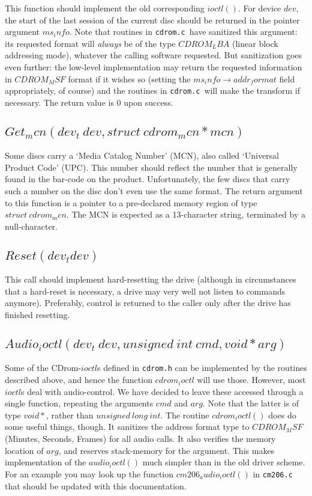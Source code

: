 \documentclass{article}
\def\cdrom{{\sc CDrom}}
\def\cdromc{{\tt cdrom.c}}
\begin{document}
This function should implement the old corresponding $ioctl()$. For
device $dev$, the start of the last session of the current disc should
be returned in the pointer argument $ms_info$. Note that routines in \cdromc\ have sanitized this argument: its
requested format will {\em always\/} be of the type $CDROM_LBA$
(linear block addressing mode), whatever the calling software
requested. But sanitization goes even further: the low-level
implementation may return the requested information in $CDROM_MSF$
format if it wishes so (setting the $ms_info\rightarrow addr_format$
field appropriately, of course) and the routines in \cdromc\ will make
the transform if necessary. The return value is 0 upon success.

\subsection{$Get_mcn(dev_t\ dev, struct\ cdrom_mcn * mcn)$}

Some discs carry a `Media Catalog Number' (MCN), also called
`Universal Product Code' (UPC). This number should reflect the number that
is generally found in the bar-code on the product. Unfortunately, the
few discs that carry such a number on the disc don't even use the same
format. The return argument to this function is a pointer to a
pre-declared memory region of type $struct\ cdrom_mcn$. The MCN is
expected as a 13-character string, terminated by a null-character.

\subsection{$Reset(dev_t dev)$}

This call should implement hard-resetting the drive (although in
circumstances that a hard-reset is necessary, a drive may very well
not listen to commands anymore). Preferably, control is returned to the
caller only after the drive has finished resetting.

\subsection{$Audio_ioctl(dev_t\ dev, unsigned\ int\ cmd, void *
arg)$}

Some of the \cdrom-$ioctl$s defined in {\tt cdrom.h} can be
implemented by the routines described above, and hence the function
$cdrom_ioctl$ will use those. However, most $ioctl$s deal with
audio-control. We have decided to leave these accessed through a
single function, repeating the arguments $cmd$ and $arg$. Note that
the latter is of type $void*{}$, rather than $unsigned\ long\
int$. The routine $cdrom_ioctl()$ does do some useful things,
though. It sanitizes the address format type to $CDROM_MSF$ (Minutes,
Seconds, Frames) for all audio calls. It also verifies the memory
location of $arg$, and reserves stack-memory for the argument. This
makes implementation of the $audio_ioctl()$ much simpler than in the
old driver scheme. For an example you may look up the function
$cm206_audio_ioctl()$ in {\tt cm206.c} that should be updated with
this documentation. 
\end{document}
